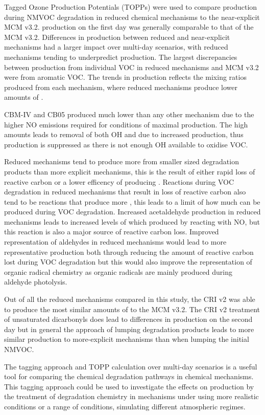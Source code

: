 Tagged Ozone Production Potentials (TOPPs) were used to compare  production during NMVOC degradation in reduced chemical mechanisms to the near-explicit MCM v3.2. 
 production on the first day was generally comparable to that of the MCM v3.2.
Differences in  production between reduced and near-explicit mechanisms had a larger impact over multi-day scenarios, with reduced mechanisms tending to underpredict  production.  
The largest discrepancies between  production from individual VOC in reduced mechanisms and MCM v3.2 were from aromatic VOC.
The trends in  production reflects the  mixing ratios produced from each mechanism, where reduced mechanisms produce lower amounts of .

CBM-IV and CB05 produced much lower  than any other mechanism due to the higher NO emissions required for conditions of maximal  production.
The high  amounts leads to removal of both OH and  due to increased  production, thus  production is suppressed as there is not enough OH available to oxidise VOC.

Reduced mechanisms tend to produce more  from smaller sized degradation products than more explicit mechanisms, this is the result of either rapid loss of reactive carbon or a lower efficency of producing .
Reactions during VOC degradation in reduced mechanisms that result in loss of reactive carbon also tend to be reactions that produce more , this leads to a limit of how much  can be produced during VOC degradation.
Increased acetaldehyde production in reduced mechanisms leads to increased levels of  which produced  by reacting with NO, but this reaction is also a major source of reactive carbon loss.
Improved representation of aldehydes in reduced mechanisms would lead to more representative  production both through reducing the amount of reactive carbon lost during VOC degradation but this would also improve the representation of organic radical chemistry as organic radicals are mainly produced during aldehyde photolysis.

Out of all the reduced mechanisms compared in this study, the CRI v2 was able to produce the most similar amounts of  to the MCM v3.2.
The CRI v2 treatment of unsaturated dicarbonyls does lead to differences in  production on the second day but in general the approach of lumping degradation products leads to more similar  production to more-explicit mechanisms than when lumping the initial NMVOC.

The tagging approach and TOPP calculation over multi-day scenarios is a useful tool for comparing the chemical degradation pathways in chemical mechanisms. 
This tagging approach could be used to investigate the effects on  production by the treatment of degradation chemistry in mechanisms under using more realistic  conditions or a range of  conditions, simulating different atmospheric regimes. 
